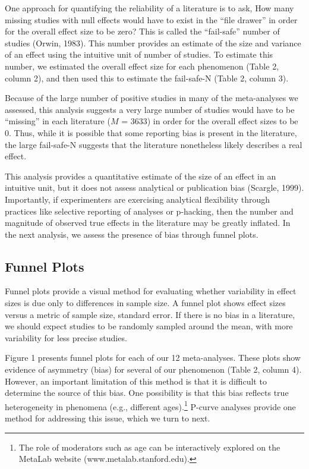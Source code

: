 \documentclass[english,floatsintext,man]{apa6}
\begin{document}
One approach for quantifying the reliability of a literature is to ask,
How many missing studies with null effects would have to exist in the
\enquote{file drawer} in order for the overall effect size to be zero?
This is called the \enquote{fail-safe} number of studies (Orwin, 1983).
This number provides an estimate of the size and variance of an effect
using the intuitive unit of number of studies. To estimate this number,
we estimated the overall effect size for each phenomenon (Table 2,
column 2), and then used this to estimate the fail-safe-N (Table 2,
column 3).

Because of the large number of positive studies in many of the
meta-analyses we assessed, this analysis suggests a very large number of
studies would have to be \enquote{missing} in each literature (\(M\) =
3633) in order for the overall effect sizes to be 0. Thus, while it is
possible that some reporting bias is present in the literature, the
large fail-safe-N suggests that the literature nonetheless likely
describes a real effect.

This analysis provides a quantitative estimate of the size of an effect
in an intuitive unit, but it does not assess analytical or publication
bias (Scargle, 1999). Importantly, if experimenters are exercising
analytical flexibility through practices like selective reporting of
analyses or p-hacking, then the number and magnitude of observed true
effects in the literature may be greatly inflated. In the next analysis,
we assess the presence of bias through funnel plots.

\subsection{Funnel Plots}\label{funnel-plots}

Funnel plots provide a visual method for evaluating whether variability
in effect sizes is due only to differences in sample size. A funnel plot
shows effect sizes versus a metric of sample size, standard error. If
there is no bias in a literature, we should expect studies to be
randomly sampled around the mean, with more variability for less precise
studies.

Figure 1 presents funnel plots for each of our 12 meta-analyses. These
plots show evidence of asymmetry (bias) for several of our phenomenon
(Table 2, column 4). However, an important limitation of this method is
that it is difficult to determine the source of this bias. One
possibility is that this bias reflects true heterogeneity in phenomena
(e.g., different
ages).\footnote{The role of moderators such as age can be interactively explored on the MetaLab website (www.metalab.stanford.edu).}
P-curve analyses provide one method for addressing this issue, which we
turn to next.
\end{document}
